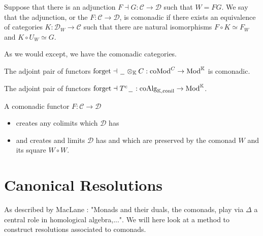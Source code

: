 \documentclass[../thesis.tex]{subfiles}
\begin{document}
    \begin{definition}[Comonadicity]
        Suppose that there is an adjunction $F \dashv G : \mathcal{C} \rightarrow \mathcal{D}$ such that $W = FG$. We say that the adjunction, or the $F : \mathcal{C} \rightarrow \mathcal{D}$, is comonadic if there exists an equivalence of categories $K : \mathcal{D}_W \rightarrow \mathcal{C}$ such that there are natural isomorphisms $F\circ K \simeq F_W$ and $K\circ U_W \simeq G$.
    \end{definition}

    As we would except, we have the comonadic categories.
    \begin{example}
        The adjoint pair of functors $\text{forget} \dashv \hspace{0.05cm}\underline{\hspace{0.2cm}}\hspace{0.05cm}\otimes_\mathbb{K} C : \text{coMod}^C \rightarrow \text{Mod}^\mathbb{K}$ is comonadic.
    \end{example}

    \begin{example}
        The adjoint pair of functors $\text{forget} \dashv T^c\hspace{0.05cm}\underline{\hspace{0.2cm}}\hspace{0.05cm} : \text{coAlg}_{\mathbb{K},\text{conil}} \rightarrow \text{Mod}^\mathbb{K}$.
    \end{example}

    \begin{thm}\label{thm: limit-creation}
        A comonadic functor $F : \mathcal{C} \rightarrow \mathcal{D}$
        \begin{itemize}
            \item creates any colimits which $\mathcal{D}$ has
            \item and creates and limits $\mathcal{D}$ has and which are preserved by the comonad $W$ and its square $W\circ W$.
        \end{itemize}
    \end{thm}

    \section{Canonical Resolutions}
        As described by MacLane \cite[180]{MacLane71}: "Monads and their duals, the comonads, play via $\Delta$ a central role in homological algebra,...". We will here look at a method to construct resolutions associated to comonads.
\end{document}
